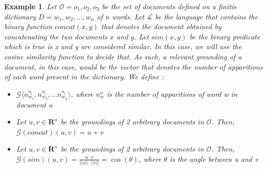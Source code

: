 \documentclass{article}
\newtheorem{example}{Example}[section]
\begin{document}
\begin{example}
Let $\mathcal{O} = {o_1,o_2, o_3}$ be the set of documents defined on a finitie dictionary $D = {w_1, w_2, ..., w_n}$ of n words. Let $\mathcal{L}$ be the language that contains the binary function $concat(x, y)$  that denotes the document obtained by concatenating the two documents $x$ and $y$. Let $sim(x, y)$ be the binary predicate which is true is x and y are considered similar. In this case, we will use the cosine similarity function to decide that. As such, a relevant grounding of a document, in this case, would be the vector that denotes the number of apparitions of each word present in the dictionary. We define \cite{LTN}:\\
\begin{itemize}
	\item $\mathcal{G}\langle n_{w_1}^{o_i}, n_{w_2}^{o_i}, ... n_{w_n}^{o_i}\rangle$, where $n_{w}^{o}$ is the number of apparitions of word w in document o
	\item Let $u, v \in \mathbf{R}^n$ be the groundings of 2 arbitrary documents in $\mathcal{O}$. Then, $\mathcal{G}(concat)(u, v) = u + v$
	\item Let $u, v \in \mathbf{R}^n$ be the groundings of 2 arbitrary documents in $\mathcal{O}$. Then, $\mathcal{G}(sim)(u, v) = \frac{u \cdot v}{||u|| \cdot ||v||} =\cos(\theta)$, where $\theta$ is the angle between u and v
\end{itemize}


\end{example}
\end{document}
